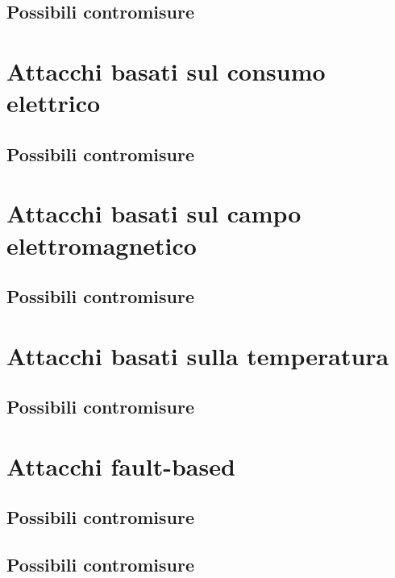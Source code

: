 	\subsection{Possibili contromisure}	
	\lipsum[1-5]
	\section{Attacchi basati sul consumo elettrico}
	\lipsum[1-5]
	\subsection{Possibili contromisure}	
	\lipsum[1-5]
	\section{Attacchi basati sul campo elettromagnetico}
	\lipsum[1-5]
	\subsection{Possibili contromisure}	
	\lipsum[1-5]
	\section{Attacchi basati sulla temperatura}
	\lipsum[1-5]
	\subsection{Possibili contromisure}	
	\lipsum[1-5]
	\section{Attacchi fault-based}
	\lipsum[1-5]
	\subsection{Possibili contromisure}	
	\lipsum[1-5]
	\subsection{Possibili contromisure}	
	\lipsum[1-5]